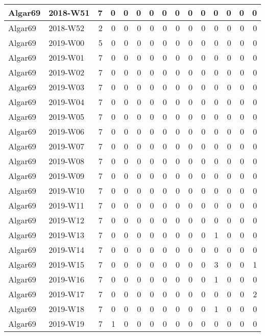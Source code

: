 \documentclass[]{book}
\begin{document}
\begin{table}
\begin{tabular}[t]{l|l|r|r|r|r|r|r|r|r|r|r|r|r|r}
\hline
Algar69 & 2018-W51 & 7 & 0 & 0 & 0 & 0 & 0 & 0 & 0 & 0 & 0 & 0 & 0 & 0\\
\hline
Algar69 & 2018-W52 & 2 & 0 & 0 & 0 & 0 & 0 & 0 & 0 & 0 & 0 & 0 & 0 & 0\\
\hline
Algar69 & 2019-W00 & 5 & 0 & 0 & 0 & 0 & 0 & 0 & 0 & 0 & 0 & 0 & 0 & 0\\
\hline
Algar69 & 2019-W01 & 7 & 0 & 0 & 0 & 0 & 0 & 0 & 0 & 0 & 0 & 0 & 0 & 0\\
\hline
Algar69 & 2019-W02 & 7 & 0 & 0 & 0 & 0 & 0 & 0 & 0 & 0 & 0 & 0 & 0 & 0\\
\hline
Algar69 & 2019-W03 & 7 & 0 & 0 & 0 & 0 & 0 & 0 & 0 & 0 & 0 & 0 & 0 & 0\\
\hline
Algar69 & 2019-W04 & 7 & 0 & 0 & 0 & 0 & 0 & 0 & 0 & 0 & 0 & 0 & 0 & 0\\
\hline
Algar69 & 2019-W05 & 7 & 0 & 0 & 0 & 0 & 0 & 0 & 0 & 0 & 0 & 0 & 0 & 0\\
\hline
Algar69 & 2019-W06 & 7 & 0 & 0 & 0 & 0 & 0 & 0 & 0 & 0 & 0 & 0 & 0 & 0\\
\hline
Algar69 & 2019-W07 & 7 & 0 & 0 & 0 & 0 & 0 & 0 & 0 & 0 & 0 & 0 & 0 & 0\\
\hline
Algar69 & 2019-W08 & 7 & 0 & 0 & 0 & 0 & 0 & 0 & 0 & 0 & 0 & 0 & 0 & 0\\
\hline
Algar69 & 2019-W09 & 7 & 0 & 0 & 0 & 0 & 0 & 0 & 0 & 0 & 0 & 0 & 0 & 0\\
\hline
Algar69 & 2019-W10 & 7 & 0 & 0 & 0 & 0 & 0 & 0 & 0 & 0 & 0 & 0 & 0 & 0\\
\hline
Algar69 & 2019-W11 & 7 & 0 & 0 & 0 & 0 & 0 & 0 & 0 & 0 & 0 & 0 & 0 & 0\\
\hline
Algar69 & 2019-W12 & 7 & 0 & 0 & 0 & 0 & 0 & 0 & 0 & 0 & 0 & 0 & 0 & 0\\
\hline
Algar69 & 2019-W13 & 7 & 0 & 0 & 0 & 0 & 0 & 0 & 0 & 0 & 1 & 0 & 0 & 0\\
\hline
Algar69 & 2019-W14 & 7 & 0 & 0 & 0 & 0 & 0 & 0 & 0 & 0 & 0 & 0 & 0 & 0\\
\hline
Algar69 & 2019-W15 & 7 & 0 & 0 & 0 & 0 & 0 & 0 & 0 & 0 & 3 & 0 & 0 & 1\\
\hline
Algar69 & 2019-W16 & 7 & 0 & 0 & 0 & 0 & 0 & 0 & 0 & 0 & 1 & 0 & 0 & 0\\
\hline
Algar69 & 2019-W17 & 7 & 0 & 0 & 0 & 0 & 0 & 0 & 0 & 0 & 0 & 0 & 0 & 2\\
\hline
Algar69 & 2019-W18 & 7 & 0 & 0 & 0 & 0 & 0 & 0 & 0 & 0 & 1 & 0 & 0 & 0\\
\hline
Algar69 & 2019-W19 & 7 & 1 & 0 & 0 & 0 & 0 & 0 & 0 & 0 & 0 & 0 & 0 & 0\\

\end{tabular}
\end{table}
\end{document}

